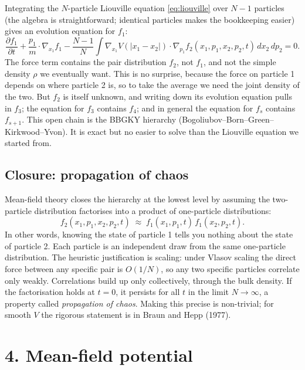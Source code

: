 \documentclass{article}
\begin{document}
Integrating the \(N\)-particle Liouville equation \eqref{eq:liouville} over \(N-1\) particles (the algebra is straightforward; identical particles makes the bookkeeping easier) gives an evolution equation for \(f_1\):
\begin{equation}
\frac{\partial f_1}{\partial t}
+ \frac{p_1}{m} \cdot \nabla_{x_1} f_1
- \frac{N-1}{N} \int \nabla_{x_1} V(|x_1 - x_2|) \cdot \nabla_{p_1} f_2(x_1, p_1, x_2, p_2, t)\, dx_2\, dp_2 = 0.
\label{eq:f1evo}
\end{equation}
The force term contains the pair distribution \(f_2\), not \(f_1\), and not the simple density \(\rho\) we eventually want. This is no surprise, because the force on particle 1 depends on where particle 2 is, so to take the average we need the joint density of the two. But \(f_2\) is itself unknown, and writing down its evolution equation pulls in \(f_3\); the equation for \(f_3\) contains \(f_4\); and in general the equation for \(f_s\) contains \(f_{s+1}\). This open chain is the BBGKY hierarchy (Bogoliubov--Born--Green--Kirkwood--Yvon). It is exact but no easier to solve than the Liouville equation we started from.

\subsection*{Closure: propagation of chaos}

Mean-field theory closes the hierarchy at the lowest level by assuming the two-particle distribution factorises into a product of one-particle distributions:
\begin{equation}
f_2(x_1, p_1, x_2, p_2, t) \;\approx\; f_1(x_1, p_1, t)\, f_1(x_2, p_2, t).
\label{eq:closure}
\end{equation}
In other words, knowing the state of particle 1 tells you nothing about the state of particle 2. Each particle is an independent draw from the same one-particle distribution. The heuristic justification is scaling: under Vlasov scaling the direct force between any specific pair is \(O(1/N)\), so any two specific particles correlate only weakly. Correlations build up only collectively, through the bulk density. If the factorisation holds at \(t=0\), it persists for all \(t\) in the limit \(N \to \infty\), a property called \emph{propagation of chaos}. Making this precise is non-trivial; for smooth \(V\) the rigorous statement is in Braun and Hepp (1977).

\section*{4. Mean-field potential}
\end{document}
